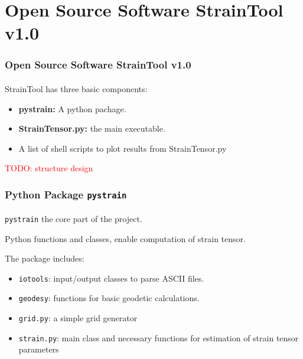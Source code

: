 \section{Open Source Software \textbf{StrainTool v1.0}}
 

\begin{frame}
  \frametitle{Open Source Software \textbf{StrainTool v1.0}}
  \framesubtitle{}
  \label{ch2:straintool}
  
  StrainTool has three basic components:
  \begin{itemize}
    \item \textbf{pystrain:} A python pachage.
    \item \textbf{StrainTensor.py:} the main executable.
    \item A list of shell scripts to plot results from StrainTensor.py
  \end{itemize}
  \textcolor{red}{TODO: structure design}
  
\end{frame}
\note{}


\begin{frame}
  \frametitle{Python Package \texttt{pystrain}}
  \framesubtitle{}
  \label{ch2:}
  
  \texttt{pystrain} the core part of the project.
  
  Python functions and classes, enable computation of strain tensor.
  
  The package includes:
  \begin{itemize}
    \item \texttt{iotools}: input/output classes to parse ASCII files.
    \item \texttt{geodesy}: functions for basic geodetic calculations.
    \item \texttt{grid.py}: a simple grid generator
    \item \texttt{strain.py}: main class and necessary functions for estimation of strain  tensor parameters
  \end{itemize}
  
  

\end{frame}
\note{}


